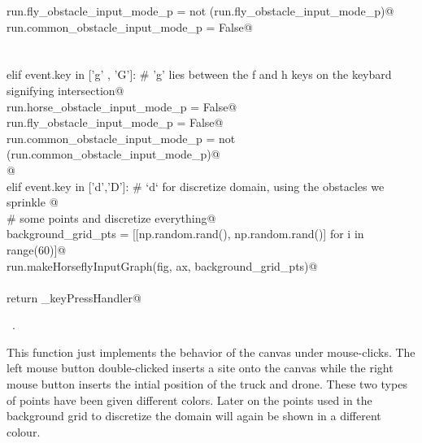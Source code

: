 \documentclass[11.5pt]{report}
\begin{document}
\begin{flushleft}
\begin{list}{}{}
\mbox{}\verb@                  run.fly_obstacle_input_mode_p     = not (run.fly_obstacle_input_mode_p)@\\
\mbox{}\verb@                  run.common_obstacle_input_mode_p  = False@\\
\mbox{}\verb@@\\
\mbox{}\verb@@\\
\mbox{}\verb@             elif event.key in ['g' , 'G']: # 'g' lies between the f and h keys on the keybard signifying intersection@\\
\mbox{}\verb@                  run.horse_obstacle_input_mode_p   = False@\\
\mbox{}\verb@                  run.fly_obstacle_input_mode_p     = False@\\
\mbox{}\verb@                  run.common_obstacle_input_mode_p  = not (run.common_obstacle_input_mode_p)@\\
\mbox{}\verb@    @\\
\mbox{}\verb@             elif event.key in ['d','D']: # `d` for discretize domain, using the obstacles we sprinkle @\\
\mbox{}\verb@                                          # some points and discretize everything@\\
\mbox{}\verb@                  background_grid_pts = [[np.random.rand(), np.random.rand()] for i in range(60)]@\\
\mbox{}\verb@                  run.makeHorseflyInputGraph(fig, ax, background_grid_pts)@\\
\mbox{}\verb@@\\
\mbox{}\verb@      return _keyPressHandler@\\
\mbox{}\verb@@{\NWsep}
\end{list}
\vspace{-1.5ex}
\footnotesize
\begin{list}{}{\setlength{\itemsep}{-\parsep}\setlength{\itemindent}{-\leftmargin}}
\item \NWtxtMacroRefIn\ .

\item{}
\end{list}
\vspace{4ex}
\end{flushleft}

This function just implements the behavior of the canvas under mouse-clicks. The left mouse button double-clicked inserts a site onto 
the canvas while the right mouse button inserts the intial position of the truck and drone. These two types of points have been given 
different colors. Later on the points used in the background grid to discretize the domain will again be shown in a different colour. 
\end{document}
